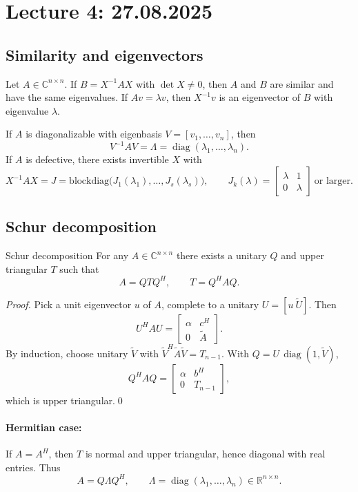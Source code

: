 \section{Lecture 4: 27.08.2025}

\subsection{Similarity and eigenvectors}

Let \(A\in\mathbb{C}^{n\times n}\). If \(B=X^{-1}AX\) with \(\det X\neq0\), then \(A\) and \(B\) are similar and have the same eigenvalues. If \(Av=\lambda v\), then \(X^{-1}v\) is an eigenvector of \(B\) with eigenvalue \(\lambda\).

If \(A\) is diagonalizable with eigenbasis \(V=[v_1,\ldots,v_n]\), then
\[
V^{-1}AV=\Lambda=\operatorname{diag}(\lambda_1,\ldots,\lambda_n).
\]
If \(A\) is defective, there exists invertible \(X\) with
\[
X^{-1}AX=J=\text{blockdiag}\Big(J_1(\lambda_1),\ldots,J_s(\lambda_s)\Big),\qquad
J_k(\lambda)=\begin{bmatrix}\lambda&1\\[2pt]0&\lambda\end{bmatrix}\ \text{or larger}.
\]

\subsection{Schur decomposition}
\begin{theorem}{Schur decomposition}
For any \(A\in\mathbb{C}^{n\times n}\) there exists a unitary \(Q\) and upper triangular \(T\) such that
\[
A=QTQ^H,\qquad T=Q^HAQ.
\]
\end{theorem}

\begin{proof}
Pick a unit eigenvector \(u\) of \(A\), complete to a unitary \(U=[u\ \tilde U]\). Then
\[
U^HAU=\begin{bmatrix}\alpha&c^H\\0&\tilde A\end{bmatrix}.
\]
By induction, choose unitary \(\tilde V\) with \(\tilde V^H\tilde A\tilde V=T_{n-1}\). With
\(Q=U\,\operatorname{diag}(1,\tilde V)\),
\[
Q^HAQ=\begin{bmatrix}\alpha&b^H\\0&T_{n-1}\end{bmatrix},
\]
which is upper triangular.\qed
\end{proof}

\paragraph{Hermitian case:}
If \(A=A^H\), then \(T\) is normal and upper triangular, hence diagonal with real entries. Thus
\[
A=Q\Lambda Q^H,\qquad \Lambda=\operatorname{diag}(\lambda_1,\ldots,\lambda_n)\in\mathbb{R}^{n\times n}.
\]

